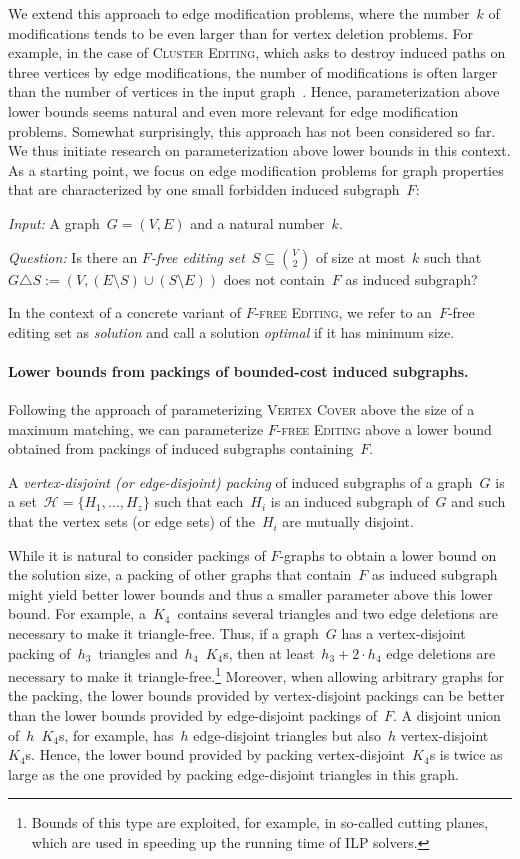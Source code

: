 \documentclass[envcountsame,numbook,smallextended]{svjour3}
\numberwithin{equation}{section}
\numberwithin{figure}{section}
\newcommand{\decprob}[3]{\pagebreak[3]
  \begin{problem}[\boldmath#1]
    \begin{compactdesc}
        \item[\normalfont\it Input:] #2
        \item[\normalfont\it Question:] #3
    \end{compactdesc}
  \end{problem}
}
\newcommand{\symdiff}{\triangle}
\newcommand{\ffed}{\textsc{$F$-free Editing}}
\newcommand{\gfedset}[1]{\ensuremath{#1}-free editing set}
\newcommand{\packing}{\ensuremath{\mathcal H}}
\begin{document}
We extend this approach to edge modification problems, where the number~$k$ of modifications tends to be even larger than for vertex deletion problems. For example, in the case of \textsc{Cluster Editing}, which asks to destroy induced paths on three vertices by edge modifications, the number of modifications is often larger than the number of vertices in the input graph~\cite{BBBT09}. Hence, parameterization above lower bounds
seems natural and even more relevant for edge modification problems. Somewhat surprisingly, this approach has not been considered so far.
We thus initiate research on parameterization above lower bounds in this context.
As a starting point, we focus on edge modification problems for graph properties that are characterized by one small forbidden induced subgraph~$F$:

\decprob{\textsc{$F$-free Editing}}{A graph~$G=(V,E)$ and a natural number~$k$.}{Is there an \emph{\gfedset{F}}~$S\subseteq\binom{V}{2}$ of size at most~$k$ such that~$G\symdiff{} S:=(V,(E\setminus S)\cup(S\setminus E))$ does not contain~\(F\) as induced subgraph?}
In the context of a concrete variant of \ffed{}, we refer to an~\gfedset{F} as \emph{solution} and call a solution \emph{optimal} if it has minimum size.  

\paragraph{Lower bounds from packings of bounded-cost induced subgraphs.}
Following the approach of parameterizing \textsc{Vertex Cover} above the size of a maximum matching, we can parameterize \ffed{} above a lower bound obtained from packings of induced subgraphs containing~\(F\).

\begin{definition}
  A \emph{vertex-disjoint (or edge-disjoint) packing} of induced subgraphs of a graph~$G$ is a set~$\packing=\{H_1,\ldots,H_z\}$ such that each~$H_i$ is an induced subgraph of~$G$ and such that the vertex sets (or edge sets) of the~$H_i$ are mutually disjoint.
\end{definition}
While it is natural to consider packings of $F$-graphs to obtain a lower bound on the solution size, a packing of other graphs that contain~$F$ as induced subgraph might yield better lower bounds and thus a smaller parameter above this lower bound. For example, a~$K_4$~contains several triangles and two edge deletions are necessary to make it triangle-free. Thus, if a graph~$G$ has a vertex-disjoint packing of~$h_3$~triangles and~$h_4$~$K_4$s, then at least~$h_3 + 2\cdot h_4$ edge deletions are necessary to make it triangle-free.\footnote{Bounds of this type are exploited, for example, in so-called cutting planes, which are used in speeding up the running time of ILP solvers. } Moreover, when allowing arbitrary graphs for the packing, the lower bounds provided by vertex-disjoint packings can be better than the lower bounds provided by edge-disjoint packings of~$F$. A disjoint union of~$h$~$K_4$s, for example, has~$h$ edge-disjoint triangles but also~$h$ vertex-disjoint~$K_4$s. Hence, the lower bound provided by packing vertex-disjoint~$K_4$s is twice as large as the one provided by packing edge-disjoint triangles in this graph.
\end{document}
